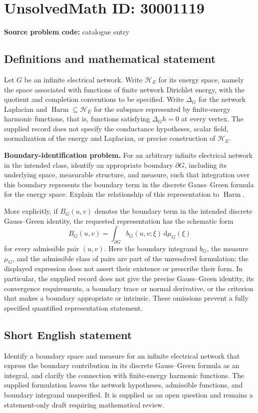 \documentclass[11pt]{article}
\begin{document}
\section*{UnsolvedMath ID: 30001119}
\textbf{Source problem code:} catalogue entry
\subsection{Definitions and mathematical statement}
Let \(G\) be an infinite electrical network. Write \(\mathcal H_E\) for its energy space, namely the space associated with functions of finite network Dirichlet energy, with the quotient and completion conventions to be specified. Write \(\Delta_G\) for the network Laplacian and \(\operatorname{Harm}\subseteq\mathcal H_E\) for the subspace represented by finite-energy harmonic functions, that is, functions satisfying \(\Delta_G h=0\) at every vertex. The supplied record does not specify the conductance hypotheses, scalar field, normalization of the energy and Laplacian, or precise construction of \(\mathcal H_E\).

\textbf{Boundary-identification problem.} For an arbitrary infinite electrical network in the intended class, identify an appropriate boundary \(\partial G\), including its underlying space, measurable structure, and measure, such that integration over this boundary represents the boundary term in the discrete Gauss--Green formula for the energy space. Explain the relationship of this representation to \(\operatorname{Harm}\).

More explicitly, if \(B_G(u,v)\) denotes the boundary term in the intended discrete Gauss--Green identity, the requested representation has the schematic form
\[
 B_G(u,v)=\int_{\partial G} b_G(u,v;\xi)\,\mathrm d\mu_G(\xi)
\]
for every admissible pair \((u,v)\). Here the boundary integrand \(b_G\), the measure \(\mu_G\), and the admissible class of pairs are part of the unresolved formulation; the displayed expression does not assert their existence or prescribe their form. In particular, the supplied record does not give the precise Gauss--Green identity, its convergence requirements, a boundary trace or normal derivative, or the criterion that makes a boundary appropriate or intrinsic. These omissions prevent a fully specified quantified representation statement.
\subsection{Short English statement}
Identify a boundary space and measure for an infinite electrical network that express the boundary contribution in its discrete Gauss--Green formula as an integral, and clarify the connection with finite-energy harmonic functions. The supplied formulation leaves the network hypotheses, admissible functions, and boundary integrand unspecified. It is supplied as an open question and remains a statement-only draft requiring mathematical review.
\end{document}
